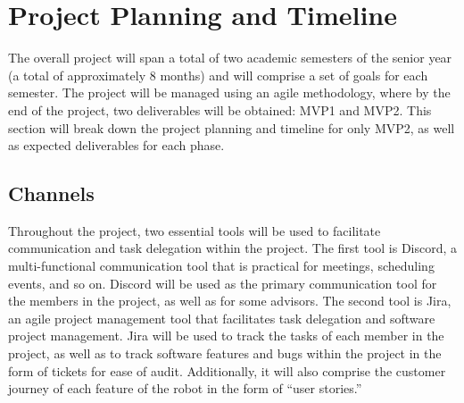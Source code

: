 \section{Project Planning and Timeline}
The overall project will span a total of two academic semesters of the senior year (a total of approximately 8 months) and will comprise a set of goals for each semester. The project will be managed using an agile methodology, where by the end of the project, two deliverables will be obtained: MVP1 and MVP2. This section will break down the project planning and timeline for only MVP2, as well as expected deliverables for each phase.

\subsection{Channels}
Throughout the project, two essential tools will be used to facilitate communication and task delegation within the project. The first tool is Discord, a multi-functional communication tool that is practical for meetings, scheduling events, and so on. Discord will be used as the primary communication tool for the members in the project, as well as for some advisors. The second tool is Jira, an agile project management tool that facilitates task delegation and software project management. Jira will be used to track the tasks of each member in the project, as well as to track software features and bugs within the project in the form of tickets for ease of audit. Additionally, it will also comprise the customer journey of each feature of the robot in the form of “user stories.”

